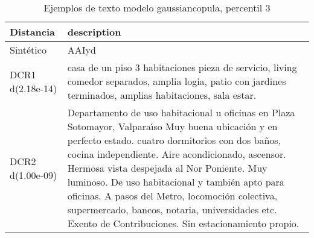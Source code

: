 \begin{table}[H]
\centering
\fontsize{10}{14}\selectfont
\caption{Ejemplos de texto modelo gaussiancopula, percentil 3}
\label{table-example-economicos-b-1-gaussiancopula-3p-text}
\begin{tabular}{|l|m{35em}|}
\hline
\rowcolor[gray]{0.8}
Distancia & description \\
\hline Sintético & AAIyd \\
\hline DCR1 d(2.18e-14) & casa de un piso 3 habitaciones pieza de servicio, living comedor separados, amplia logia, patio con jardines terminados, amplias habitaciones, sala estar. \\
\hline DCR2 d(1.00e-09) & Departamento de uso habitacional u oficinas en Plaza Sotomayor, Valpara{\'\i}so
Muy buena ubicaci\'on y en perfecto estado.
cuatro dormitorios con dos ba\~nos, cocina independiente.
Aire acondicionado, ascensor.
Hermosa vista despejada al Nor  Poniente. Muy luminoso. 
De uso habitacional y tambi\'en apto para oficinas. A pasos del Metro, locomoci\'on colectiva, supermercado, bancos, notaria, universidades etc.
Exento de Contribuciones.
Sin estacionamiento propio.
 \\
\hline
\end{tabular}
\end{table}
